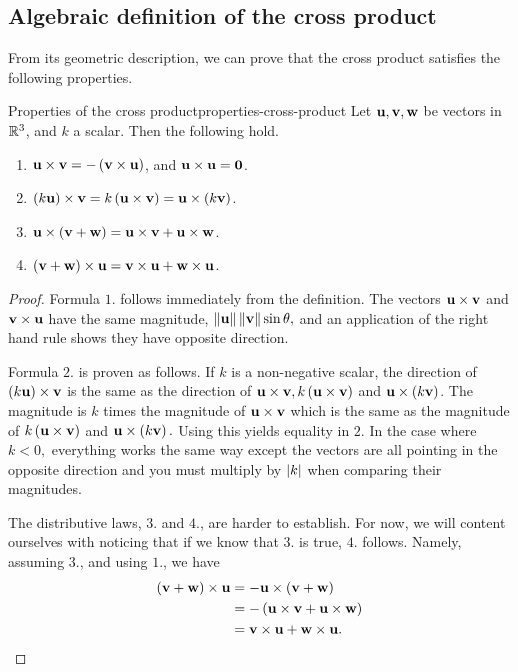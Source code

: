 \subsection{Algebraic definition of the cross product}

From its geometric description, we can prove that the cross product
satisfies the following properties.

\begin{proposition}{Properties of the cross product}{properties-cross-product}
  Let $\mbox{\bf u}, \mbox{\bf v}, \mbox{\bf w}$ be vectors in $\mathbb{R}^3$, and $k$ a
  scalar. Then the following hold.
  \begin{enumerate}
  \item
    $\mbox{\bf u}\times \mbox{\bf v}= -\left(\mbox{\bf v}\times \mbox{\bf u}\right)$,
    and $\mbox{\bf u}\times \mbox{\bf u}=\mbox{\bf 0}$.
  \item $\left(k \mbox{\bf u}\right)\times \mbox{\bf v}= k \left(\mbox{\bf u}\times \mbox{\bf v}\right) 
    =\mbox{\bf u}\times \left(k \mbox{\bf v}\right)$.
  \item $\mbox{\bf u}\times \left(\mbox{\bf v}+\mbox{\bf w}\right) =\mbox{\bf u}\times \mbox{\bf v}+\mbox{\bf u}\times \mbox{\bf w}$.
  \item $\left(\mbox{\bf v}+\mbox{\bf w}\right) \times \mbox{\bf u}=\mbox{\bf v} \times \mbox{\bf u}+\mbox{\bf w}\times \mbox{\bf u}$.
  \end{enumerate}
\end{proposition}

\begin{proof}
  Formula $1.$ follows immediately from the definition. The vectors
  $\mbox{\bf u}\times \mbox{\bf v}$ and $\mbox{\bf v}\times \mbox{\bf u}$ have the
  same magnitude, $\left\|\mbox{\bf u}\right\|\left\|\mbox{\bf v}\right\|\sin \theta ,$ and an
  application of the right hand rule shows they have opposite
  direction.

  Formula $2.$ is proven as follows. If $k $ is a non-negative scalar,
  the direction of $\left(k \mbox{\bf u}\right) \times \mbox{\bf v}$ is the same as
  the direction of
  $\mbox{\bf u}\times \mbox{\bf v}, k \left(\mbox{\bf u}\times \mbox{\bf v}\right) $ and
  $\mbox{\bf u}\times \left( k \mbox{\bf v}\right) $. The magnitude is $k$ times the
  magnitude of $\mbox{\bf u}\times \mbox{\bf v}$ which is the same as the
  magnitude of $k \left(\mbox{\bf u}\times \mbox{\bf v}\right) $ and
  $\mbox{\bf u}\times \left( k \mbox{\bf v}\right) .$ Using this yields equality in
  $2$. In the case where $k <0,$ everything works the same way except
  the vectors are all pointing in the opposite direction and you must
  multiply by $\left|k \right|$ when comparing their magnitudes.

  The distributive laws, $3.$ and $4.$, are harder to establish. For
  now, we will content ourselves with noticing that if we know that
  $3.$ is true, $4.$ follows. Namely, assuming $3.$, and using $1.$,
  we have
  \begin{align*}
    \left(\mbox{\bf v}+\mbox{\bf w}\right) \times \mbox{\bf u}
    & =-\mbox{\bf u}\times \left(
      \mbox{\bf v}+\mbox{\bf w}\right) \\
    & =-\left(\mbox{\bf u}\times \mbox{\bf v}+\mbox{\bf u}\times \mbox{\bf w}\right) \\
    & =\mbox{\bf v}\times \mbox{\bf u}+\mbox{\bf w}\times \mbox{\bf u}.
  \end{align*}
\end{proof}

